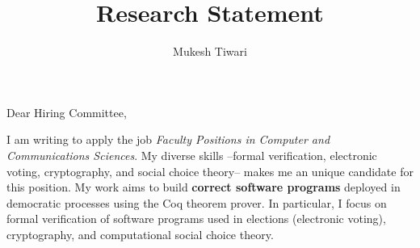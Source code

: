 \documentclass[a4paper]{article}
\title{Research Statement}
\author{Mukesh Tiwari}
\date{}
\begin{document}
\fontsize{12}{15}
\selectfont
\maketitle

Dear Hiring Committee, 

I am writing to apply the job \textit{Faculty Positions in Computer and Communications 
Sciences}. My diverse skills --formal verification, electronic voting, cryptography, 
and social choice theory-- makes me an unique candidate for this position.  
My work aims to build \textbf{correct software programs} deployed in democratic processes 
using the Coq theorem prover. In particular, I focus on formal verification of 
software programs used 
in elections (electronic voting), cryptography, and computational social choice theory. 
\end{document}

